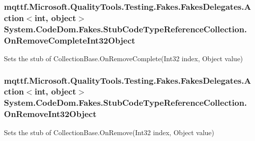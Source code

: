 \hypertarget{class_system_1_1_code_dom_1_1_fakes_1_1_stub_code_type_reference_collection_a777f948b311185d87e72dd4e0b29aee1}{
\subsubsection[{On\-Remove\-Complete\-Int32\-Object}]{\setlength{\rightskip}{0pt plus 5cm}mqttf.\-Microsoft.\-Quality\-Tools.\-Testing.\-Fakes.\-Fakes\-Delegates.\-Action$<$int, object$>$ System.\-Code\-Dom.\-Fakes.\-Stub\-Code\-Type\-Reference\-Collection.\-On\-Remove\-Complete\-Int32\-Object}}\label{class_system_1_1_code_dom_1_1_fakes_1_1_stub_code_type_reference_collection_a777f948b311185d87e72dd4e0b29aee1}


Sets the stub of Collection\-Base.\-On\-Remove\-Complete(\-Int32 index, Object value)

\hypertarget{class_system_1_1_code_dom_1_1_fakes_1_1_stub_code_type_reference_collection_a8da1b1373094bc7132ad6ad7ed193243}{
\subsubsection[{On\-Remove\-Int32\-Object}]{\setlength{\rightskip}{0pt plus 5cm}mqttf.\-Microsoft.\-Quality\-Tools.\-Testing.\-Fakes.\-Fakes\-Delegates.\-Action$<$int, object$>$ System.\-Code\-Dom.\-Fakes.\-Stub\-Code\-Type\-Reference\-Collection.\-On\-Remove\-Int32\-Object}}\label{class_system_1_1_code_dom_1_1_fakes_1_1_stub_code_type_reference_collection_a8da1b1373094bc7132ad6ad7ed193243}


Sets the stub of Collection\-Base.\-On\-Remove(\-Int32 index, Object value)

